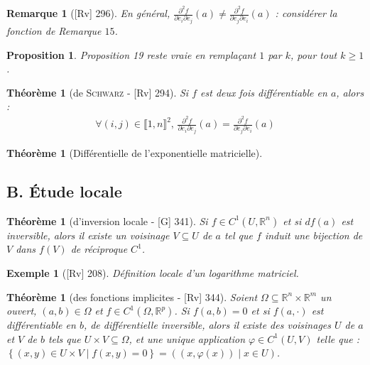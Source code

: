 \documentclass[10pt, a4paper, parskip=full, twoside, twocolumn]{report}
\newtheorem{theorem}[definition]{Théorème}
\newtheorem{proposition}[definition]{Proposition}
\newtheorem{example}[definition]{Exemple}
\newtheorem{remark}[definition]{Remarque}
\newcommand{\IR}{\mathbb{R}}
\begin{document}
\begin{remark}[\textnormal{[Rv] 296}]
	En général, $\frac{\partial^2 f}{\partial e_i\partial e_j}(a)\neq \frac{\partial^2 f}{\partial e_j\partial e_i}(a)$ : considérer la fonction de Remarque $15$.
\end{remark}

\begin{proposition}
	Proposition 19 reste vraie en remplaçant $1$ par $k$, pour tout $k\geq 1$.
\end{proposition}

\begin{theorem}[de \textsc{Schwarz} - \textnormal{[Rv] 294}]
	Si $f$ est deux fois différentiable en $a$, alors :
	\begin{align*}
		\forall (i,j)\in\llbracket 1,n\rrbracket^2,\,  \frac{\partial^2 f}{\partial e_i\partial e_j}(a) = \frac{\partial^2 f}{\partial e_j\partial e_i}(a)
	\end{align*}
\end{theorem}

\begin{tcolorbox}[
    breakable, %
    colback=developpement, %
    colframe=gray!0!black, %
    boxrule=0pt, %
    arc=1mm, %
	boxsep=0pt,
	left=0pt, right=0pt, top=0pt, bottom=0pt
]
\begin{theorem}[Différentielle de l'exponentielle matricielle]
	\label{215dev1}
\end{theorem}
\end{tcolorbox}

\subsection*{B. Étude locale}
\begin{theorem}[d'inversion locale - \textnormal{[G] 341}]
	Si $f\in C^1(U,\IR^n)$ et si $df(a)$ est inversible, alors il existe un voisinage $V\subseteq U$ de $a$ tel que $f$ induit une bijection de $V$ dans $f(V)$ de réciproque $C^1$.
\end{theorem}

\begin{example}[\textnormal{[Rv] 208}]
	Définition locale d'un logarithme matriciel.
\end{example}

\begin{theorem}[des fonctions implicites - \textnormal{[Rv] 344}]
	Soient $\Omega\subseteq \IR^n\times\IR^m$ un ouvert, $(a,b)\in \Omega$ et $f\in C^1(\Omega,\IR^p)$.
	Si $f(a,b)=0$ et si $f(a,\cdot)$ est différentiable en $b$, de différentielle inversible, alors il existe des voisinages $U$ de $a$ et $V$ de $b$ tels que $U\times V \subseteq \Omega$,
	et une unique application $\varphi\in C^1(U,V)$ telle que : $\left\{(x,y)\in U\times V\mid f(x,y)=0\right\} = \left( (x,\varphi(x)) \mid x\in U\right)$.
\end{theorem}
\end{document}
